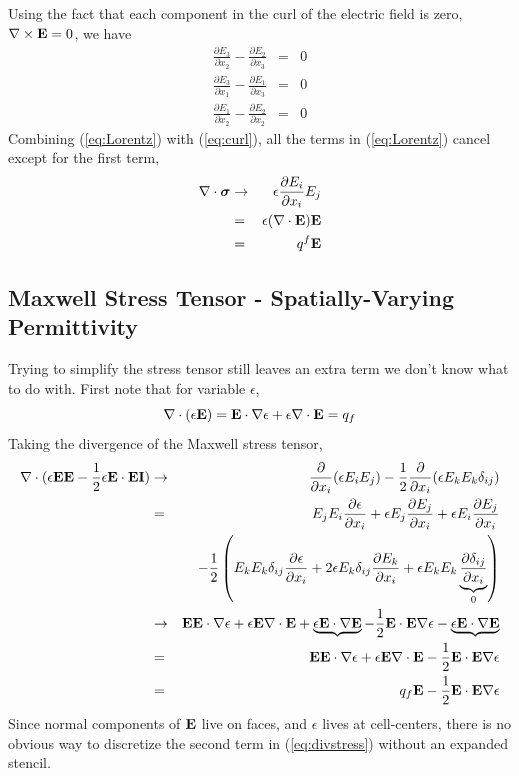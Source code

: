 \documentclass[final]{siamltex}
\def\Eb {{\bf E}}
\def\Ib {{\bf I}}
\def\sigmab {\boldsymbol{\sigma}}
\def\half   {\frac{1}{2}}
\begin{document}
Using the fact that each component in the curl of the electric field is zero,
$\nabla\times\Eb=0$, we have
\begin{eqnarray}
\frac{\partial E_3}{\partial x_2} - \frac{\partial E_2}{\partial x_3} &=& 0 \nonumber\\
\frac{\partial E_3}{\partial x_1} - \frac{\partial E_1}{\partial x_3} &=& 0 \nonumber\\
\frac{\partial E_1}{\partial x_2} - \frac{\partial E_2}{\partial x_2} &=& 0 \label{eq:curl}
\end{eqnarray}
Combining (\ref{eq:Lorentz}) with (\ref{eq:curl}), all the terms in (\ref{eq:Lorentz})
cancel except for the first term,
\begin{eqnarray}
\nabla\cdot\sigmab &\rightarrow& \epsilon\frac{\partial E_i}{\partial x_i}E_j \nonumber\\
&=& \epsilon (\nabla\cdot\Eb) \Eb \nonumber\\
&=& q^f\Eb
\end{eqnarray}

\clearpage

\subsection{Maxwell Stress Tensor - Spatially-Varying Permittivity}
Trying to simplify the stress tensor still leaves an extra term we don't know what
to do with.  First note that for variable $\epsilon$,
\begin{equation}
\nabla\cdot(\epsilon\Eb) = \Eb\cdot\nabla\epsilon + \epsilon\nabla\cdot\Eb = q_f
\end{equation}
Taking the divergence of the Maxwell stress tensor,
\begin{eqnarray}
\nabla\cdot(\epsilon\Eb\Eb - \half\epsilon\Eb\cdot\Eb\Ib) &\rightarrow& \frac{\partial}{\partial x_i}(\epsilon E_iE_j) - \half\frac{\partial}{\partial x_i}(\epsilon E_kE_k\delta_{ij}) \nonumber\\
&=& E_jE_i\frac{\partial\epsilon}{\partial x_i} + \epsilon E_j\frac{\partial E_j}{\partial x_i} + \epsilon E_i\frac{\partial E_j}{\partial x_i} \nonumber\\
&& - \half\left(E_kE_k\delta_{ij}\frac{\partial\epsilon}{\partial x_i} + 2\epsilon E_k\delta_{ij}\frac{\partial E_k}{\partial x_i} + \epsilon E_kE_k\underbrace{\frac{\partial\delta_{ij}}{\partial x_i}}_{0}\right)\nonumber\\
&\rightarrow& \Eb\Eb\cdot\nabla\epsilon + \epsilon\Eb\nabla\cdot\Eb + \underbrace{\epsilon\Eb\cdot\nabla\Eb} - \half\Eb\cdot\Eb\nabla\epsilon - \underbrace{\epsilon\Eb\cdot\nabla\Eb}\nonumber\\
&=& \Eb\Eb\cdot\nabla\epsilon + \epsilon\Eb\nabla\cdot\Eb - \half\Eb\cdot\Eb\nabla\epsilon\nonumber\\
&=& q_f \Eb - \half\Eb\cdot\Eb\nabla\epsilon\label{eq:divstress}
\end{eqnarray}
Since normal components of $\Eb$ live on faces, and $\epsilon$ lives at cell-centers, there 
is no obvious way to discretize the second term in (\ref{eq:divstress}) without an
expanded stencil.
\end{document}
